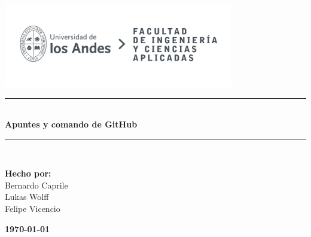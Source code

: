 \documentclass{article} %
\begin{document}
\begin{titlepage}%
\newcommand{\HRule}{\rule{\linewidth}{0.5mm}} 
\center 
\includegraphics[width=10cm]{LOGO_UNIVERSIDAD.jpg}\\ %
\vspace{3cm}
\HRule \\[0.4cm]
{ \huge \bfseries Apuntes y comando de GitHub}\\[0.4cm] %
\HRule \\[1.5cm]
 \vspace{5cm}
\begin{flushright}
    { \textbf{Hecho por:}\\
    Bernardo Caprile\\
    Lukas Wolff\\
    Felipe Vicencio\\
    
}
\end{flushright}
\vspace{1cm}
{\large \textbf{\today}}\\[2cm] %
\end{titlepage}
\end{document}

